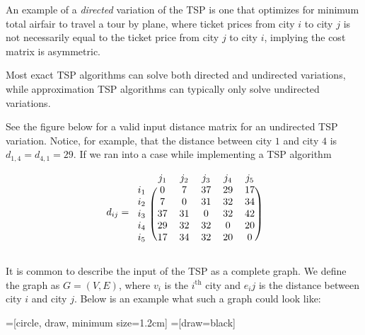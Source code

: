 \documentclass[11pt,fleqn]{article}
\begin{document}
An example of a \textit{directed} variation of the TSP is one that
optimizes for minimum total airfair to travel a tour by plane,
where ticket prices from city $i$ to city $j$ is not necessarily
equal to the ticket price from city $j$ to city $i$, implying the
cost matrix is asymmetric.
\par

Most exact TSP algorithms can solve both directed and undirected variations,
while approximation TSP algorithms can typically only solve undirected
variations.
\par

See the figure below for a valid input distance matrix for an undirected
TSP variation.  Notice, for example, that the distance between city $1$
and city $4$ is $d_{1,4}=d_{4,1}=29$.  If we ran into a case while
implementing a TSP algorithm
\par

\begin{align*}
  d_{ij}=
  \begin{blockarray}{cccccc}
    & j_1 & j_2 & j_3 & j_4 & j_5 \\
  \begin{block}{c(ccccc)}
    i_1 & 0 & 7 & 37 & 29 & 17 \\
    i_2 & 7 & 0 & 31 & 32 & 34 \\
    i_3 & 37 & 31 & 0 & 32 & 42 \\
    i_4 & 29 & 32 & 32 & 0 & 20 \\
    i_5 & 17 & 34 & 32 & 20 & 0 \\
  \end{block}
  \end{blockarray}
\end{align*}

It is common to describe the input of the TSP as a complete graph.
We define the graph as $G=(V,E)$, where $v_i$ is the $i^{\text{th}}$
city and $e_ij$ is the distance between city $i$ and city $j$.  Below
is an example what such a graph could look like:

=[circle, draw, minimum size=1.2cm]
=[draw=black]
\end{document}

